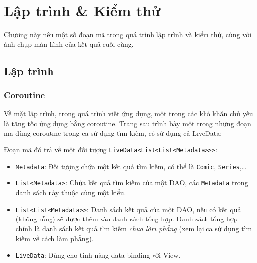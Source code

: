 \documentclass[../../thesis]{subfiles}
\begin{document}
\chapter{Lập trình \& Kiểm thử}\label{chap:implementation}

Chương này nêu một số đoạn mã trong quá trình lập trình và kiểm thử, cùng với
ảnh chụp màn hình của kết quả cuối cùng.



\section{Lập trình}\label{sec:coding}

\subsection{Coroutine}

Về mặt lập trình, trong quá trình viết ứng dụng, một trong các khó khăn chủ yếu
là tăng tốc ứng dụng bằng coroutine. Trang sau trình bày một trong những đoạn mã
dùng coroutine trong ca sử dụng tìm kiếm, có sử dụng cả LiveData:

Đoạn mã đó trả về một đối tượng \texttt{LiveData<List<List<Metadata>>>}:

\begin{itemize}
    \item
        \texttt{Metadata}: Đối tượng chứa một kết quả tìm kiếm, có thể là
        \texttt{Comic}, \texttt{Series},\ldots{}
    \item
        \texttt{List<Metadata>}: Chứa kết quả tìm kiếm của một DAO, các
        \texttt{Metadata} trong danh sách này thuộc cùng một kiểu.
    \item
        \texttt{List<List<Metadata>>}: Danh sách kết quả của một DAO, nếu có kết
        quả (không rỗng) sẽ được thêm vào danh sách tổng hợp. Danh sách tổng hợp
        chính là danh sách kết quả tìm kiếm \emph{chưa làm phẳng} (xem lại
        \hyperref[sec:search-comic]{ca sử dụng tìm kiếm} về cách làm phẳng).
    \item
        \texttt{LiveData}: Dùng cho tính năng data binding với View.
\end{itemize}
\end{document}

